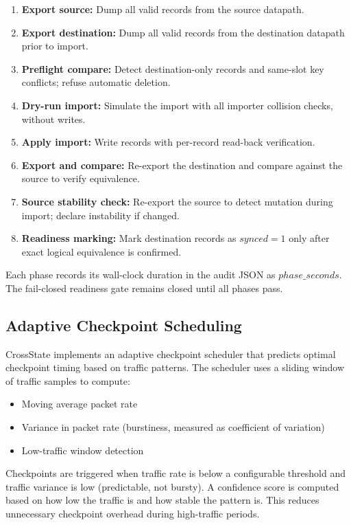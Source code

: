 \documentclass[10pt, conference]{IEEEtran}
\begin{document}
\begin{enumerate}
    \item \textbf{Export source:} Dump all valid records from the source datapath.
    \item \textbf{Export destination:} Dump all valid records from the destination datapath prior to import.
    \item \textbf{Preflight compare:} Detect destination-only records and same-slot key conflicts; refuse automatic deletion.
    \item \textbf{Dry-run import:} Simulate the import with all importer collision checks, without writes.
    \item \textbf{Apply import:} Write records with per-record read-back verification.
    \item \textbf{Export and compare:} Re-export the destination and compare against the source to verify equivalence.
    \item \textbf{Source stability check:} Re-export the source to detect mutation during import; declare instability if changed.
    \item \textbf{Readiness marking:} Mark destination records as $synced=1$ only after exact logical equivalence is confirmed.
\end{enumerate}

Each phase records its wall-clock duration in the audit JSON as $phase\_seconds$. The fail-closed readiness gate remains closed until all phases pass.

\subsection{Adaptive Checkpoint Scheduling}
\label{subsec:adaptive_sched}
CrossState implements an adaptive checkpoint scheduler that predicts optimal checkpoint timing based on traffic patterns. The scheduler uses a sliding window of traffic samples to compute:
\begin{itemize}
    \item Moving average packet rate
    \item Variance in packet rate (burstiness, measured as coefficient of variation)
    \item Low-traffic window detection
\end{itemize}

Checkpoints are triggered when traffic rate is below a configurable threshold and traffic variance is low (predictable, not bursty). A confidence score is computed based on how low the traffic is and how stable the pattern is. This reduces unnecessary checkpoint overhead during high-traffic periods.
\end{document}
